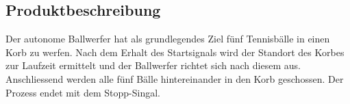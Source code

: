 \subsection{Produktbeschreibung}
Der autonome Ballwerfer hat als grundlegendes Ziel fünf Tennisbälle in einen Korb zu werfen. Nach dem Erhalt des Startsignals wird der Standort des Korbes zur Laufzeit ermittelt und der Ballwerfer richtet sich nach diesem aus. Anschliessend werden alle fünf Bälle hintereinander in den Korb geschossen. Der Prozess endet mit dem Stopp-Singal.